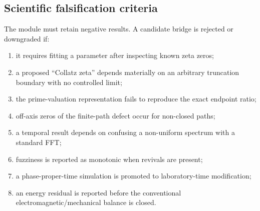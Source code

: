 \subsection{Scientific falsification criteria}

The module must retain negative results. A candidate bridge is rejected or downgraded if:
\begin{enumerate}[leftmargin=2em]
\item it requires fitting a parameter after inspecting known zeta zeros;
\item a proposed ``Collatz zeta'' depends materially on an arbitrary truncation boundary with no controlled limit;
\item the prime-valuation representation fails to reproduce the exact endpoint ratio;
\item off-axis zeros of the finite-path defect occur for non-closed paths;
\item a temporal result depends on confusing a non-uniform spectrum with a standard FFT;
\item fuzziness is reported as monotonic when revivals are present;
\item a phase-proper-time simulation is promoted to laboratory-time modification;
\item an energy residual is reported before the conventional electromagnetic/mechanical balance is closed.
\end{enumerate}
